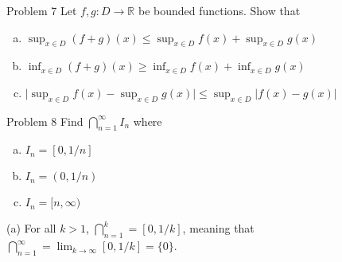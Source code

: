 \documentclass[8pt]{extarticle}
\newcommand{\R}{\mathbb{R}}
\begin{document}
  \begin{problem}{Problem 7}
    Let $f,g: D\rightarrow\R$ be bounded functions. Show that
    \begin{enumerate}[(a)]
      \item $\sup_{x\in D}(f+g)(x) \leq \sup_{x\in D}f(x) + \sup_{x\in D}g(x)$
      \item $\inf_{x\in D}(f+g)(x) \geq \inf_{x\in D}f(x) + \inf_{x\in D}g(x)$
      \item $\vert \sup_{x\in D}f(x) - \sup_{x\in D}g(x) \vert \leq \sup_{x\in D}\vert f(x) - g(x) \vert$
    \end{enumerate}
  \end{problem}
  \begin{problem}{Problem 8}
    Find $\bigcap_{n = 1}^{\infty} I_n$ where
    \begin{enumerate}[(a)]
      \item $I_n = [0,1/n]$
      \item $I_n = (0,1/n)$
      \item $I_n = [n,\infty)$
    \end{enumerate}
    \tcblower
    \begin{problem}{(a)}
      For all $k > 1$, $\bigcap_{n=1}^{k} = [0,1/k]$, meaning that $\bigcap_{n=1}^{\infty} = \lim_{k\rightarrow\infty}[0,1/k] = \{0\}$.
    \end{problem}
  \end{problem}
\end{document}
